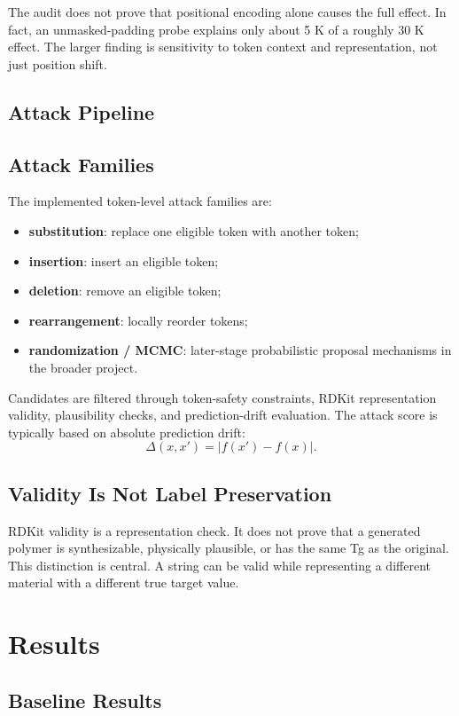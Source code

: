 \documentclass[11pt]{article}
\begin{document}
The audit does not prove that positional encoding alone causes the full effect.
In fact, an unmasked-padding probe explains only about 5 K of a roughly 30 K
effect. The larger finding is sensitivity to token context and representation,
not just position shift.

\subsection{Attack Pipeline}

\subsection{Attack Families}

The implemented token-level attack families are:
\begin{itemize}
  \item \textbf{substitution}: replace one eligible token with another token;
  \item \textbf{insertion}: insert an eligible token;
  \item \textbf{deletion}: remove an eligible token;
  \item \textbf{rearrangement}: locally reorder tokens;
  \item \textbf{randomization / MCMC}: later-stage probabilistic proposal mechanisms in the broader project.
\end{itemize}

Candidates are filtered through token-safety constraints, RDKit representation
validity, plausibility checks, and prediction-drift evaluation. The attack score
is typically based on absolute prediction drift:
\[
\Delta(x,x') = |f(x') - f(x)|.
\]

\subsection{Validity Is Not Label Preservation}

RDKit validity is a representation check. It does not prove that a generated
polymer is synthesizable, physically plausible, or has the same Tg as the
original. This distinction is central. A string can be valid while representing
a different material with a different true target value.

\section{Results}

\subsection{Baseline Results}
\end{document}
